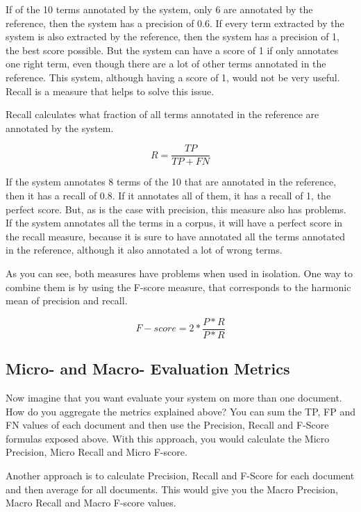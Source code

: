 If of the 10 terms annotated by the system, only 6 are annotated by the reference, then the system has a precision of 0.6. If every term extracted by the system is also extracted by the reference, then the system has a precision of 1, the best score possible. But the system can have a score of 1 if only annotates one right term, even though there are a lot of other terms annotated in the reference. This system, although having a score of 1, would not be very useful. Recall is a measure that helps to solve this issue.

Recall calculates what fraction of all terms annotated in the reference are annotated by the system.

\begin{equation}
R = \frac{TP}{TP+FN}
\end{equation}

If the system annotates 8 terms of the 10 that are annotated in the reference, then it has a recall of 0.8. If it annotates all of them, it has a recall of 1, the perfect score. But, as is the case with precision, this measure also has problems. If the system annotates all the terms in a corpus, it will have a perfect score in the recall measure, because it is sure to have annotated all the terms annotated in the reference, although it also annotated a lot of wrong terms. 

As you can see, both measures have problems when used in isolation. One way to combine them is by using the F-score measure, that corresponds to the harmonic mean of precision and recall. 

\begin{equation}
F−score = 2 * \frac{P*R}{P*R}
\end{equation}

\subsection{Micro- and Macro- Evaluation Metrics}

Now imagine that you want evaluate your system on more than one document. How do you aggregate the metrics explained above? You can sum the TP, FP and FN values of each document and then use the Precision, Recall and F-Score formulas exposed above. With this approach, you would calculate the Micro Precision, Micro Recall and Micro F-score.

Another approach is to calculate Precision, Recall and F-Score for each document and then average for all documents. This would give you the Macro Precision, Macro Recall and Macro F-score values. 


